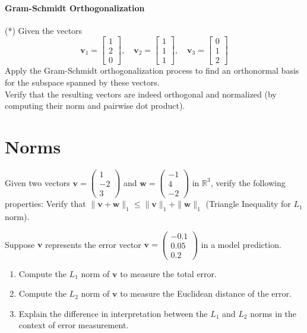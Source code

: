 \documentclass[]{article}
\begin{document}
	\paragraph{Gram-Schmidt Orthogonalization}
	(*) Given the vectors
	$$
	\mathbf{v}_1 = \begin{bmatrix}
		1 \\
		2 \\
		0
	\end{bmatrix}, \quad
	\mathbf{v}_2 = \begin{bmatrix}
		1 \\
		1 \\
		1
	\end{bmatrix}, \quad
	\mathbf{v}_3 = \begin{bmatrix}
		0 \\
		1 \\
		2
	\end{bmatrix}
	$$
	Apply the Gram-Schmidt orthogonalization process to find an orthonormal basis for the subspace spanned by these vectors.\\
	Verify that the resulting vectors are indeed orthogonal and normalized (by computing their norm and pairwise dot product).
	
	\section{Norms}
	Given two vectors $\mathbf{v} = \begin{pmatrix} 1 \\ -2 \\ 3 \end{pmatrix}$ and $\mathbf{w} = \begin{pmatrix} -1 \\ 4 \\ -2 \end{pmatrix}$ in $\mathbb{R}^3$, verify the following properties:
	Verify that $\|\mathbf{v} + \mathbf{w}\|_1 \leq \|\mathbf{v}\|_1 + \|\mathbf{w}\|_1$ (Triangle Inequality for $L_1$ norm).
	
	Suppose $\mathbf{v}$ represents the error vector $\mathbf{v} = \begin{pmatrix} -0.1 \\ 0.05 \\ 0.2 \end{pmatrix}$ in a model prediction.
	\begin{enumerate}
		\item Compute the $L_1$ norm of $\mathbf{v}$ to measure the total error.
		\item Compute the $L_2$ norm of $\mathbf{v}$ to measure the Euclidean distance of the error.
		\item Explain the difference in interpretation between the $L_1$ and $L_2$ norms in the context of error measurement.
	\end{enumerate}
	
	
\end{document}
